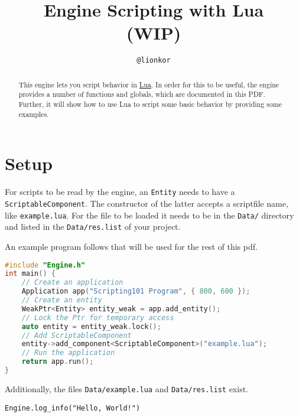 \documentclass[12pt,a4paper]{article}
\title{Engine Scripting with Lua\\(WIP)}
\author{\texttt{@lionkor}}
\begin{document}
\begin{titlepage}
\clearpage\maketitle
\thispagestyle{empty}
\end{titlepage}


\tableofcontents
\pagebreak

\begin{abstract}
This engine lets you script behavior in \href{https://www.lua.org/about.html}{Lua}. 
In order for this to be useful, the engine provides a number of functions and globals, which are documented in this PDF. Further, it will show how to use Lua to script some basic behavior by providing some examples.

\end{abstract}

\pagebreak

\setcounter{page}{1}

\section{Setup}

For scripts to be read by the engine, an \texttt{Entity} needs to have a  \texttt{ScriptableComponent}. The constructor of the latter accepts a scriptfile name, like \texttt{example.lua}. For the file to be loaded it needs to be in the \texttt{Data/} directory and listed in the \texttt{Data/res.list} of your project.

An example program follows that will be used for the rest of this pdf.

\begin{lstlisting}[language=C++,title=example.cpp]
#include "Engine.h"
int main() {
	// Create an application
	Application app("Scripting101 Program", { 800, 600 });
	// Create an entity
	WeakPtr<Entity> entity_weak = app.add_entity();
	// Lock the Ptr for temporary access
	auto entity = entity_weak.lock();
	// Add ScriptableComponent
	entity->add_component<ScriptableComponent>("example.lua");
	// Run the application
	return app.run();
}
\end{lstlisting}

Additionally, the files \texttt{Data/example.lua} and \texttt{Data/res.list} exist.

\begin{lstlisting}[language={[5.0]Lua},title=Data/example.lua]
Engine.log_info("Hello, World!")
\end{lstlisting}
\end{document}
